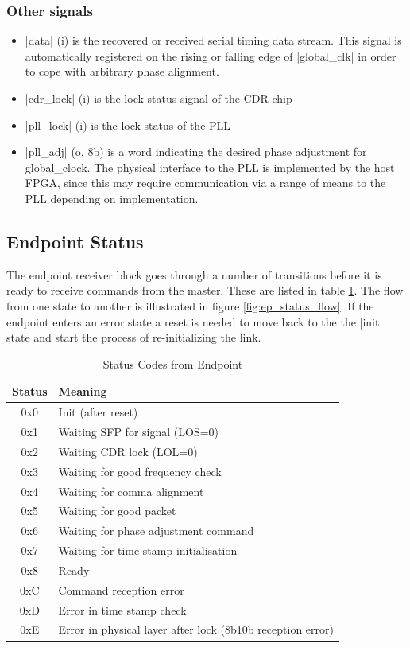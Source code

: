 \documentclass{dune}
\begin{document}
\subsubsection{Other signals}

\begin{itemize}
	\item |data| (i) is the recovered or received serial timing data stream. This signal is automatically registered on the rising or falling edge of |global_clk| in order to cope with arbitrary phase alignment.
	\item |cdr_lock| (i) is the lock status signal of the CDR chip
	\item |pll_lock| (i) is the lock status of the PLL
	\item |pll_adj| (o, 8b) is a word indicating the desired phase adjustment for global\_clock. The physical interface to the PLL is implemented by the host FPGA, since this may require communication via a range of means to the PLL depending on implementation.
\end{itemize}

\subsection{Endpoint Status}

The endpoint receiver block goes through a number of transitions before it is ready to receive commands from the master. These are listed in table \ref{tab:ep_status}. The flow from one state to another is illustrated in figure \ref{fig:ep_status_flow}. If the endpoint enters an error state a reset is needed to move back to the the |init| state and start the process of re-initializing the link.

\begin{table}[h!]
    \centering
    \begin{tabular}{c|l} \toprule
        Status & Meaning \\ \midrule
        0x0 & Init (after reset)\\
        0x1 & Waiting SFP for signal (LOS=0)\\
        0x2 & Waiting CDR lock (LOL=0)\\
        0x3 & Waiting for good frequency check\\
        0x4 & Waiting for comma alignment\\
        0x5 & Waiting for good packet\\
        0x6 & Waiting for phase adjustment command\\
        0x7 & Waiting for time stamp initialisation\\
        0x8 & Ready\\
        0xC & Command reception error\\
        0xD & Error in time stamp check\\
        0xE & Error in physical layer after lock (8b10b reception error)\\
         \bottomrule
    \end{tabular}
    \caption{Status Codes from Endpoint}
    \label{tab:ep_status}
\end{table}
\end{document}
